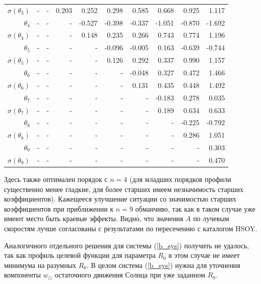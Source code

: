 \documentclass{matmex-diploma-custom}
\begin{document}
\begin{table}[h!!]
\begin{tabular}{r|rrr|r|rrrrr}
 $\sigma(\theta_3)$&-      &    - &   0.203 &   0.252 &   0.298 &   0.585 &   0.668 &   0.925 &   1.117  \\
 $\theta_4$&-      &    - &    - &  -0.527 &  -0.398 &  -0.337 &  -1.051 &  -0.870 &  -1.692  \\
 $\sigma(\theta_4)$&-      &    - &    - &    0.148 &   0.235 &   0.266 &   0.743 &   0.774 &   1.196  \\
 $\theta_5$&-      &    - &    - &    - &  -0.096 &  -0.005 &   0.163 &  -0.639 &  -0.744  \\
 $\sigma(\theta_5)$&-      &    - &    - &    - &    0.126 &   0.292 &   0.337 &   0.990 &   1.157  \\
 $\theta_6$&-      &    - &    - &    - &    - &   -0.048 &   0.327 &   0.472 &   1.466  \\
 $\sigma(\theta_6)$&-    &    - &    - &    - &    - &   0.131 &   0.435 &   0.448 &   1.492  \\
 $\theta_7$&-     &    - &    - &    - &    - &    - &  -0.183 &   0.278 &   0.035  \\
 $ \sigma(\theta_7)$&-     &    - &    - &    - &    - &    - &     0.189 &   0.634 &   0.633  \\
 $\theta_8$&-     &    - &    - &    - &    - &    - &    - &   -0.225 &  -0.792  \\
 $ \sigma(\theta_8)$&-     &    - &    - &    - &    - &    - &    - &    0.286 &   1.051  \\
 $\theta_9$&-     &    - &    - &    - &    - &    - &    - &    - &  0.303  \\
 $ \sigma(\theta_9)$&-     &    - &    - &    - &    - &    - &    - &    - &   0.470  \\
\end{tabular}
\end{table}

\par Здесь также оптимален порядок с $n=4$ (для младших порядков профили существенно менее гладкие, для более старших имеем незначимость старших коэффициентов). Кажещееся улучшение ситуации со значимостью старших коэффициентов при приближении к $n=9$ обманчиво, так как в таком случае уже имеют место быть краевые эффекты. Видно, что значения $A$ по лучевым скоростям лучше согласованы с результатами по пересечению с каталогом HSOY.

Аналогичного отдельного решения для системы (\ref{b_sys}) получить не удалось, так как профиль целевой функции для параметра $R_0$ в этом случае не имеет минимума на разумных $R_0$. В целом система (\ref{b_sys}) нужна для уточнения компоненты $w_{\odot}$ остаточного движения Солнца при уже заданном $R_0$.
\end{document}
